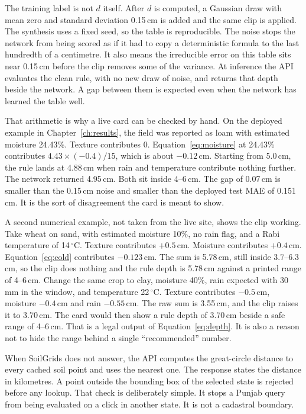 The training label is not $d$ itself. After $d$ is computed, a Gaussian draw with mean zero and standard deviation 0.15\,cm is added and the same clip is applied. The synthesis uses a fixed seed, so the table is reproducible. The noise stops the network from being scored as if it had to copy a deterministic formula to the last hundredth of a centimetre. It also means the irreducible error on this table sits near 0.15\,cm before the clip removes some of the variance. At inference the API evaluates the clean rule, with no new draw of noise, and returns that depth beside the network. A gap between them is expected even when the network has learned the table well.

That arithmetic is why a live card can be checked by hand. On the deployed example in Chapter~\ref{ch:results}, the field was reported as loam with estimated moisture 24.43\%. Texture contributes 0. Equation~\eqref{eq:moisture} at 24.43\% contributes $4.43 \times (-0.4)/15$, which is about $-0.12$\,cm. Starting from 5.0\,cm, the rule lands at 4.88\,cm when rain and temperature contribute nothing further. The network returned 4.95\,cm. Both sit inside 4--6\,cm. The gap of 0.07\,cm is smaller than the 0.15\,cm noise and smaller than the deployed test MAE of 0.151\,cm. It is the sort of disagreement the card is meant to show.

A second numerical example, not taken from the live site, shows the clip working. Take wheat on sand, with estimated moisture 10\%, no rain flag, and a Rabi temperature of 14\,$^{\circ}$C. Texture contributes $+0.5$\,cm. Moisture contributes $+0.4$\,cm. Equation~\eqref{eq:cold} contributes $-0.123$\,cm. The sum is 5.78\,cm, still inside 3.7--6.3\,cm, so the clip does nothing and the rule depth is 5.78\,cm against a printed range of 4--6\,cm. Change the same crop to clay, moisture 40\%, rain expected with 30\,mm in the window, and temperature 22\,$^{\circ}$C. Texture contributes $-0.5$\,cm, moisture $-0.4$\,cm and rain $-0.55$\,cm. The raw sum is 3.55\,cm, and the clip raises it to 3.70\,cm. The card would then show a rule depth of 3.70\,cm beside a safe range of 4--6\,cm. That is a legal output of Equation~\eqref{eq:depth}. It is also a reason not to hide the range behind a single ``recommended'' number.

When SoilGrids does not answer, the API computes the great-circle distance to every cached soil point and uses the nearest one. The response states the distance in kilometres. A point outside the bounding box of the selected state is rejected before any lookup. That check is deliberately simple. It stops a Punjab query from being evaluated on a click in another state. It is not a cadastral boundary.

